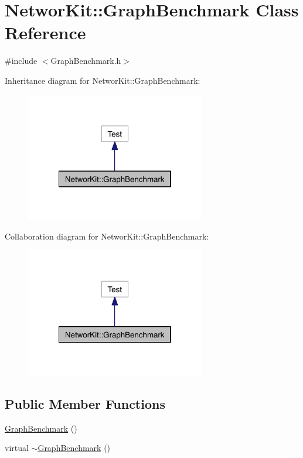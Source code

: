 \hypertarget{class_networ_kit_1_1_graph_benchmark}{\section{Networ\-Kit\-:\-:Graph\-Benchmark Class Reference}
\label{class_networ_kit_1_1_graph_benchmark}
}


{\ttfamily \#include $<$Graph\-Benchmark.\-h$>$}



Inheritance diagram for Networ\-Kit\-:\-:Graph\-Benchmark\-:\nopagebreak
\begin{figure}[H]
\begin{center}
\leavevmode
\includegraphics[width=222pt]{class_networ_kit_1_1_graph_benchmark__inherit__graph}
\end{center}
\end{figure}


Collaboration diagram for Networ\-Kit\-:\-:Graph\-Benchmark\-:\nopagebreak
\begin{figure}[H]
\begin{center}
\leavevmode
\includegraphics[width=222pt]{class_networ_kit_1_1_graph_benchmark__coll__graph}
\end{center}
\end{figure}
\subsection*{Public Member Functions}
\begin{DoxyCompactItemize}
\item 
\hyperlink{class_networ_kit_1_1_graph_benchmark_ab56e1f58e5c68eaa2ee4a4370abee112}{Graph\-Benchmark} ()
\item 
virtual \hyperlink{class_networ_kit_1_1_graph_benchmark_a335c5c3767f12db26621fe5140690e5a}{$\sim$\-Graph\-Benchmark} ()
\end{DoxyCompactItemize}

